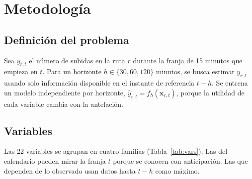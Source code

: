 \documentclass[11pt,a4paper]{article}
\begin{document}
\section{Metodología}

\subsection{Definición del problema}

Sea $y_{r,t}$ el número de subidas en la ruta $r$ durante la franja de 15 minutos que empieza en $t$. Para un horizonte $h \in \{30, 60, 120\}$ minutos, se busca estimar $y_{r,t}$ usando solo información disponible en el instante de referencia $t-h$. Se entrena un modelo independiente por horizonte, $\hat{y}_{r,t} = f_h(\mathbf{x}_{r,t})$, porque la utilidad de cada variable cambia con la antelación.

\subsection{Variables}

Las 22 variables se agrupan en cuatro familias (Tabla~\ref{tab:vars}). Las del calendario pueden mirar la franja $t$ porque se conocen con anticipación. Las que dependen de lo observado usan datos hasta $t-h$ como máximo.
\end{document}
